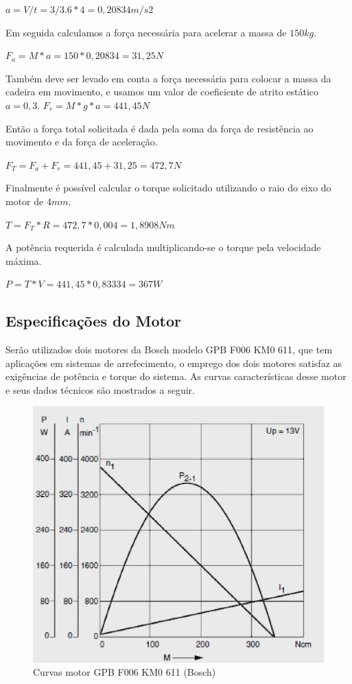 $a =V/t =3/3.6*4= 0,20834 m/s2$

Em seguida calculamos a força necessária para acelerar a massa de $150 kg$.

$F_a=M * a =150 * 0,20834 = 31,25 N$

Também deve ser levado em conta a força necessária para colocar a massa da cadeira
em movimento, e usamos um valor de coeficiente de atrito estático $a = 0,3$.
$F_r=M*g* a = 441,45N$

Então a força total solicitada é dada pela soma da força de resistência ao movimento
e da força de aceleração.

$F_T=F_a+F_r=441,45+31,25 = 472,7 N$

Finalmente é possível calcular o torque solicitado utilizando o raio do eixo do
motor de $4mm$.

$T=F_T*R=472,7*0,004=1,8908 Nm$

A potência requerida é calculada multiplicando-se o torque pela velocidade máxima.

$P=T*V=441,45*0,83334 = 367 W$

\subsection{Especificações do Motor}

Serão utilizados dois motores da Bosch modelo GPB F006 KM0 611, que tem aplicações
em sistemas de arrefecimento, o emprego dos dois motores satisfaz as exigências
de potência e torque do sistema. As curvas características desse motor e seus
dados técnicos são mostrados a seguir.

\begin{figure}[H]
  \centering
    \includegraphics[width=\textwidth]{figuras/motor.eps}
  \caption{Curvas motor GPB F006 KM0 611 (Bosch)}
  \label{fig:motor}
\end{figure}

